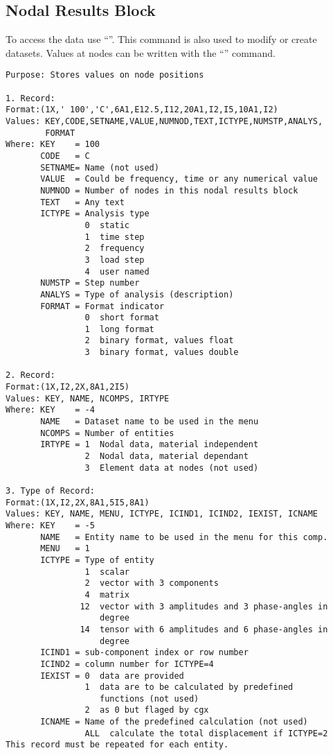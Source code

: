 \documentclass{article}
\begin{document}
\subsection{\label{Nodal Results Block}Nodal Results Block}
To access the data use ``''. This command is also used to modify or create datasets. Values at nodes can be written with the ``'' command.
\begin{verbatim}
Purpose: Stores values on node positions

1. Record:
Format:(1X,' 100','C',6A1,E12.5,I12,20A1,I2,I5,10A1,I2)
Values: KEY,CODE,SETNAME,VALUE,NUMNOD,TEXT,ICTYPE,NUMSTP,ANALYS,
        FORMAT
Where: KEY    = 100
       CODE   = C
       SETNAME= Name (not used)
       VALUE  = Could be frequency, time or any numerical value
       NUMNOD = Number of nodes in this nodal results block
       TEXT   = Any text
       ICTYPE = Analysis type
                0  static
                1  time step
                2  frequency
                3  load step
                4  user named
       NUMSTP = Step number
       ANALYS = Type of analysis (description)
       FORMAT = Format indicator
                0  short format
                1  long format 
                2  binary format, values float 
                3  binary format, values double 

2. Record:
Format:(1X,I2,2X,8A1,2I5)
Values: KEY, NAME, NCOMPS, IRTYPE
Where: KEY    = -4
       NAME   = Dataset name to be used in the menu
       NCOMPS = Number of entities
       IRTYPE = 1  Nodal data, material independent
                2  Nodal data, material dependant
                3  Element data at nodes (not used) 

3. Type of Record:
Format:(1X,I2,2X,8A1,5I5,8A1) 
Values: KEY, NAME, MENU, ICTYPE, ICIND1, ICIND2, IEXIST, ICNAME
Where: KEY    = -5
       NAME   = Entity name to be used in the menu for this comp.
       MENU   = 1
       ICTYPE = Type of entity
                1  scalar
                2  vector with 3 components
                4  matrix
               12  vector with 3 amplitudes and 3 phase-angles in
                   degree
               14  tensor with 6 amplitudes and 6 phase-angles in
                   degree
       ICIND1 = sub-component index or row number
       ICIND2 = column number for ICTYPE=4
       IEXIST = 0  data are provided
                1  data are to be calculated by predefined
                   functions (not used)
                2  as 0 but flaged by cgx
       ICNAME = Name of the predefined calculation (not used)
                ALL  calculate the total displacement if ICTYPE=2
This record must be repeated for each entity.


\end{verbatim}
\end{document}
